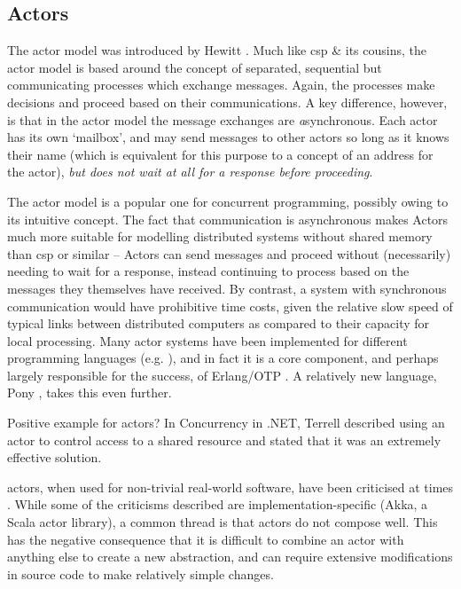 \subsection{\label{subsec:actors}Actors}
The \gls{actor} \cite{Agha1986} model was introduced by Hewitt \fxnote[inline]{[ref]}.  Much like \gls{csp} \& its cousins, the \gls{actor} model is based around the concept of separated, sequential but communicating processes which exchange messages.  Again, the processes make decisions and proceed based on their communications.  A key difference, however, is that in the \gls{actor} model the message exchanges are \emph{a}synchronous.  Each \gls{actor} has its own `mailbox', and may send messages to other actors so long as it knows their name (which is equivalent for this purpose to a concept of an address for the \gls{actor}), \emph{but does not wait at all for a response before proceeding}.

The \gls{actor} model is a popular one for concurrent programming, possibly owing to its intuitive concept.  The fact that communication is asynchronous makes Actors much more suitable for modelling distributed systems without shared memory than \gls{csp} or similar -- Actors can send messages and proceed without (necessarily) needing to wait for a response, instead continuing to process based on the messages they themselves have received.  By contrast, a system with synchronous communication would have prohibitive time costs, given the relative slow speed of typical links between distributed computers as compared to their capacity for local processing.  Many \gls{actor} systems have been implemented for different programming languages (e.g. \cite{Varela2001,Srinivasan2008,Charousset2016} ), and in fact it is a core component, and perhaps largely responsible for the success, of Erlang/OTP \cite{Armstrong2010,Armstrong2013}.  A relatively new language, Pony \cite{Clebsch2015,Clebsch2017}, takes this even further.
\begin{anfxnote}{Positive example for actors?}
In Concurrency in .NET, Terrell described using an actor to control access to a shared resource and stated that it was an extremely effective solution.
\end{anfxnote}

\Glspl{actor}, when used for non-trivial real-world software, have been criticised at times \cite{Welsh2013,Stucchio2013}.  While some of the criticisms described are implementation-specific (Akka, a Scala \gls{actor} library), a common thread is that \glspl{actor} do not compose well.  This has the negative consequence that it is difficult to combine an \gls{actor} with anything else to create a new abstraction, and can require extensive modifications in source code to make relatively simple changes.


